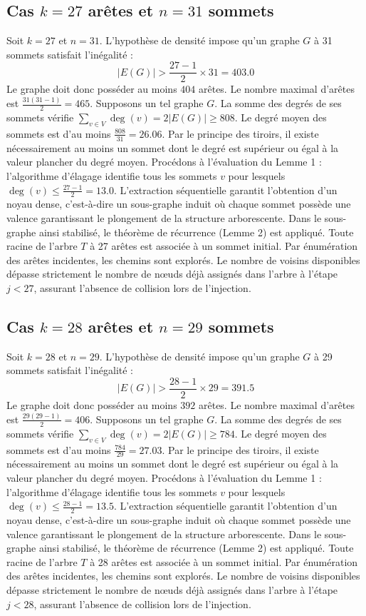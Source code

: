 \documentclass[12pt,a4paper]{article}
\begin{document}
\subsection{Cas $k = 27$ arêtes et $n = 31$ sommets}
Soit $k = 27$ et $n = 31$. L'hypothèse de densité impose qu'un graphe $G$ à 31 sommets satisfait l'inégalité :
$$ |E(G)| > \frac{27-1}{2} \times 31 = 403.0 $$
Le graphe doit donc posséder au moins $404$ arêtes. Le nombre maximal d'arêtes est $\frac{31(31-1)}{2} = 465$.
Supposons un tel graphe $G$. La somme des degrés de ses sommets vérifie $\sum_{v \in V} \deg(v) = 2|E(G)| \geq 808$.
Le degré moyen des sommets est d'au moins $\frac{808}{31} = 26.06$.
Par le principe des tiroirs, il existe nécessairement au moins un sommet dont le degré est supérieur ou égal à la valeur plancher du degré moyen.
Procédons à l'évaluation du Lemme 1 : l'algorithme d'élagage identifie tous les sommets $v$ pour lesquels $\deg(v) \leq \frac{27-1}{2} = 13.0$.
L'extraction séquentielle garantit l'obtention d'un noyau dense, c'est-à-dire un sous-graphe induit où chaque sommet possède une valence garantissant le plongement de la structure arborescente.
Dans le sous-graphe ainsi stabilisé, le théorème de récurrence (Lemme 2) est appliqué. Toute racine de l'arbre $T$ à 27 arêtes est associée à un sommet initial. Par énumération des arêtes incidentes, les chemins sont explorés. Le nombre de voisins disponibles dépasse strictement le nombre de nœuds déjà assignés dans l'arbre à l'étape $j < 27$, assurant l'absence de collision lors de l'injection.

\subsection{Cas $k = 28$ arêtes et $n = 29$ sommets}
Soit $k = 28$ et $n = 29$. L'hypothèse de densité impose qu'un graphe $G$ à 29 sommets satisfait l'inégalité :
$$ |E(G)| > \frac{28-1}{2} \times 29 = 391.5 $$
Le graphe doit donc posséder au moins $392$ arêtes. Le nombre maximal d'arêtes est $\frac{29(29-1)}{2} = 406$.
Supposons un tel graphe $G$. La somme des degrés de ses sommets vérifie $\sum_{v \in V} \deg(v) = 2|E(G)| \geq 784$.
Le degré moyen des sommets est d'au moins $\frac{784}{29} = 27.03$.
Par le principe des tiroirs, il existe nécessairement au moins un sommet dont le degré est supérieur ou égal à la valeur plancher du degré moyen.
Procédons à l'évaluation du Lemme 1 : l'algorithme d'élagage identifie tous les sommets $v$ pour lesquels $\deg(v) \leq \frac{28-1}{2} = 13.5$.
L'extraction séquentielle garantit l'obtention d'un noyau dense, c'est-à-dire un sous-graphe induit où chaque sommet possède une valence garantissant le plongement de la structure arborescente.
Dans le sous-graphe ainsi stabilisé, le théorème de récurrence (Lemme 2) est appliqué. Toute racine de l'arbre $T$ à 28 arêtes est associée à un sommet initial. Par énumération des arêtes incidentes, les chemins sont explorés. Le nombre de voisins disponibles dépasse strictement le nombre de nœuds déjà assignés dans l'arbre à l'étape $j < 28$, assurant l'absence de collision lors de l'injection.
\end{document}
